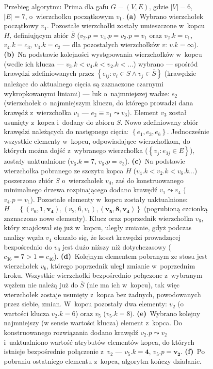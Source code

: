 \begin{figure}[!htbp]
\begin{subfigure}[b]{0.29\textwidth}
		\caption{}
		\label{fig:prime:f}
	\end{subfigure}
	\caption{
		Przebieg algorytmu Prima dla gafu $G = \left( V, E \right)$, gdzie $\left| V \right| = 6$, $\left| E \right| = 7$, o~wierzchołku początkowym $v_{1}$.
		\textbf{(a)}~Wybrano wierzchołek początkowy $v_{1}$.
		Pozostałe wierzchołki zostały umieszczone w~kopcu $H$, definiującym zbiór $\overline{S}$ ($v_{2}.p = v_{4}.p = v_{3}.p = v_{1}$ oraz $v_{2}.k = c_{1}$, $v_{4}.k = c_{3}$, $v_{3}.k = c_{2}$ --- dla pozostałych wierzchołków $v$: $v.k = \infty$).
		\textbf{(b)}~Na podstawie kolejności występowania wierzchołków w~kopcu (wedle ich klucza --- $v_{3}.k < v_{4}.k < v_{2}.k < \dots$) wybrano --- spośród krawędzi zdefiniowanych przez $\left\{ e_{ij} : v_{i} \in S \wedge v_{j} \in \overline{S} \right\}$ (krawędzie należące do aktualnego cięcia są zaznaczone czarnymi wykropkowanymi liniami) --- łuk o~najmniejszej wadze: $e_{2}$ (wierzchołek o~najmniejszym kluczu, do którego prowadzi dana krawędź z~wierzchołka $v_{1}$ --- $e_{2} \equiv v_{1} \leadsto v_{3}$).
		Element $v_{3}$ został usunięty z~kopca i~dodany do zbioru $S$.
		Nowo zdefiniowany zbiór krawędzi należących do następnego cięcia: $\left\{ e_{1}, e_{3}, e_{6} \right\}$.
		Jednocześnie wszystkie elementy w~kopcu, odpowiadające wierzchołkom, do których można dojść z~wybranego wierzchołka ($\left\{ v_{j} : e_{3j} \in E \right\}$), zostały uaktualnione ($v_{6}.k = 7$, $v_{6}.p = v_{3}$).
		\textbf{(c)}~Na podstawie wierzchołka pobranego ze szczytu kopca $H$ ($v_{4}.k < v_{2}.k < v_{6}.k \dots$) poszerzono zbiór $S$ o~wierzchołek $v_{4}$, zaś do konstruowanego minimalnego drzewa rozpinającego dodano krawędź $v_{1} \leadsto v_{4}$ ($v_{4}.p = v_{1}$).
		Pozostałe elementy w~kopcu zostały uaktualnione: $H = \left\{ \left( v_{6}, \textbf{1}, \textbf{v}_{\textbf{4}} \right), \left( v_{2}, 6, v_{1} \right), \left( \textbf{v}_{\textbf{5}}, \textbf{8}, \textbf{v}_{\textbf{4}} \right) \right\}$ (pogrubioną czcionką zaznaczono nowe elementy).
		Klucz oraz poprzednik wierzchołka $v_{6}$, który znajdował się już w~kopcu, uległy zmianie, gdyż podczas analizy węzła $v_{4}$ okazało się, że koszt krawędzi prowadzącej bezpośrednio do $v_{6}$ jest dużo niższy niż dotychczasowy ($c_{36} = 7 > 1 = c_{46}$).
		\textbf{(d)}~Kolejnym elementem pobranym ze stosu jest wierzchołek $v_{6}$, którego poprzednik uległ zmianie w~poprzednim kroku.
		Wszystkie wierzchołki bezpośrednio połączone z~wybranym węzłem nie należą już do $\overline{S}$ (nie ma ich w~kopcu), tak więc wierzchołek zostaje usunięty z~kopca bez żadnych, powodowanych przez siebie, zmian.
		W~kopcu pozostały dwa elementy: $v_{2}$ (o wartości klucza $v_{2}.k = 6$) oraz $v_{5}$ ($v_{5}.k = 8$).
		\textbf{(e)}~Wybrano kolejny najmniejszy (w sensie wartości klucza) element z~kopca.
		Do konstruowanego rozwiązania dodano krawędź $v_{2}.p \leadsto v_{2}$ i~uaktualniono wartość atrybutów elementów kopca, do których istnieje bezpośrednie połączenie z~$v_{2}$ --- $v_{5}.k = \textbf{4}$, $v_{5}.p = \textbf{v}_{\textbf{2}}$.
		\textbf{(f)}~Po pobraniu ostatniego elementu z~kopca, algorytm kończy działanie.
	}
	\label{fig:prime}
\end{figure}

